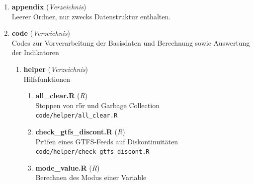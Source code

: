 


\begin{enumerate}[label=B\arabic*, ref=B\arabic*, leftmargin=*, itemsep=0.5em, topsep=0.3em]
\item \textbf{appendix} \textnormal{(\textit{Verzeichnis})}\\
Leerer Ordner, nur zwecks Datenstruktur enthalten.
\edef\appendixlabelkey{app:B\arabic{enumi}}
\expandafter\label\expandafter{\appendixlabelkey}
\item \textbf{code} \textnormal{(\textit{Verzeichnis})}\\
Codes zur Vorverarbeitung der Basisdaten und Berechnung sowie Auswertung der Indikatoren
\edef\appendixlabelkey{app:B\arabic{enumi}}
\expandafter\label\expandafter{\appendixlabelkey}
\begin{enumerate}[label=B\arabic{enumi}-\arabic*, ref=B\arabic{enumi}-\arabic*, leftmargin=*, itemsep=0.5em, topsep=0.3em]
\item \textbf{helper} \textnormal{(\textit{Verzeichnis})}\\
Hilfsfunktionen
\edef\appendixlabelkey{app:B\arabic{enumi}-\arabic{enumii}}
\expandafter\label\expandafter{\appendixlabelkey}
\begin{enumerate}[label=B\arabic{enumi}-\arabic{enumii}-\arabic*, ref=B\arabic{enumi}-\arabic{enumii}-\arabic*, leftmargin=*, itemsep=0.5em, topsep=0.3em]
\item \textbf{all\_clear.R} \textnormal{(\textit{R})}\\
Stoppen von r5r und Garbage Collection\\
\texttt{\small code/helper/all\_clear.R}
\edef\appendixlabelkey{app:B\arabic{enumi}-\arabic{enumii}-\arabic{enumiii}}
\expandafter\label\expandafter{\appendixlabelkey}
\item \textbf{check\_gtfs\_discont.R} \textnormal{(\textit{R})}\\
Prüfen eines GTFS-Feeds auf Diskontinuitäten\\
\texttt{\small code/helper/check\_gtfs\_discont.R}
\edef\appendixlabelkey{app:B\arabic{enumi}-\arabic{enumii}-\arabic{enumiii}}
\expandafter\label\expandafter{\appendixlabelkey}
\item \textbf{mode\_value.R} \textnormal{(\textit{R})}\\
Berechnen des Modus einer Variable\\

\end{enumerate}
\end{enumerate}
\end{enumerate}
